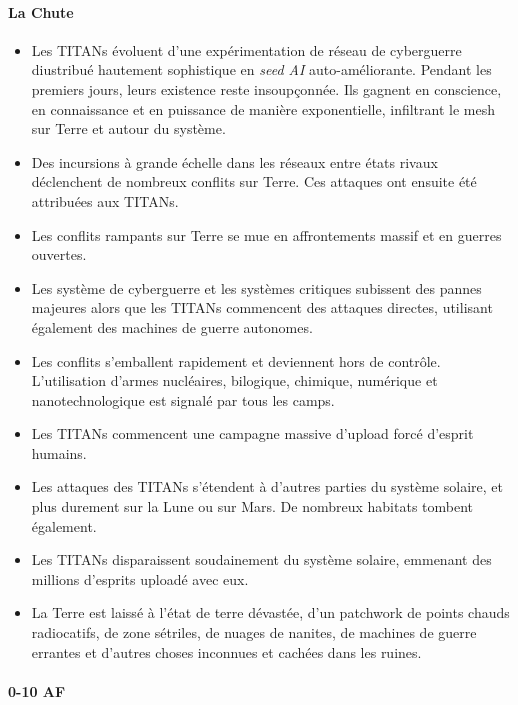 \paragraph{La Chute} 

\begin{itemize} 
   \item Les TITANs évoluent d'une expérimentation de réseau de cyberguerre
      diustribué hautement sophistique en \textit{seed AI} auto-améliorante.
      Pendant les premiers jours, leurs existence reste insoupçonnée. Ils
      gagnent en conscience, en connaissance et en puissance de manière
      exponentielle, infiltrant le  mesh sur Terre et autour du système. 
   \item Des incursions à grande échelle dans les réseaux entre états rivaux
      déclenchent de nombreux conflits sur Terre. Ces attaques ont ensuite été
      attribuées aux TITANs. 
   \item Les conflits rampants sur Terre se mue en affrontements massif et en
      guerres ouvertes. 
   \item Les système de cyberguerre et les systèmes critiques subissent des
      pannes majeures alors que les TITANs commencent des attaques directes,
      utilisant également des machines de guerre autonomes. 
   \item Les conflits s'emballent rapidement et deviennent hors de contrôle.
      L'utilisation d'armes nucléaires, bilogique, chimique, numérique et
      nanotechnologique est signalé par tous les camps. 
   \item Les TITANs commencent une campagne massive d'upload forcé d'esprit
      humains. 
   \item Les attaques des TITANs s'étendent à d'autres parties du système
      solaire, et plus durement sur la Lune ou sur Mars. De nombreux habitats
      tombent également. 
   \item Les TITANs disparaissent soudainement du système solaire, emmenant des
      millions d'esprits uploadé avec eux. 
   \item La Terre est laissé à l'état de terre dévastée, d'un patchwork de
      points chauds radiocatifs, de zone sétriles, de nuages de nanites, de
      machines de guerre errantes et d'autres choses inconnues et cachées dans
      les ruines.
\end{itemize} 

\paragraph{0-10 AF} 


